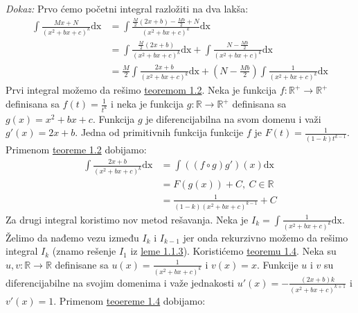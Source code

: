 \documentclass{article}
\begin{document}
\textit{Dokaz:} Prvo ćemo početni integral razložiti na dva lakša:
\begin{align*}
    \int \frac{Mx+N}{(x^2+bx+c)^k}\text{dx} & =\int \frac{\frac{M}{2}(2x+b)-\frac{Mb}{2}+N}{(x^2+bx+c)^k}\text{dx}                                    \\
                                            & =\int \frac{\frac{M}{2}(2x+b)}{(x^2+bx+c)^k}\text{dx}+\int\frac{N-\frac{Mb}{2}}{(x^2+bx+c)^k}\text{dx}  \\
                                            & =\frac{M}{2}\int \frac{2x+b}{(x^2+bx+c)^k}\text{dx}+(N-\frac{Mb}{2})\int\frac{1}{(x^2+bx+c)^k}\text{dx}
\end{align*}
Prvi integral možemo da rešimo \hyperref[teorema_1.2]{teoremom 1.2}. Neka je
funkcija $f: \mathbb{R}^{+}\longrightarrow\mathbb{R}^{+}$ definisana sa
$f(t)=\frac{1}{t^k}$ i neka je funkcija $g: \mathbb{R}\longrightarrow\mathbb{R}^{+}$
definisana sa $g(x)=x^2+bx+c$. Funkcija $g$ je diferencijabilna na svom domenu
i važi $g'(x)=2x+b$. Jedna od primitivnih funkcija funkcije $f$ je $F(t)=\frac{1}{(1-k)t^{k-1}}$.
Primenom \hyperref[teorema_1.2]{teoreme 1.2} dobijamo:
\begin{align*}
    \int \frac{2x+b}{(x^2+bx+c)^k}\text{dx} & =\int((f\circ g)g')(x)\text{dx}    \\
                                            & =F(g(x))+C,\ C\in\mathbb{R}        \\
                                            & =\frac{1}{(1-k)(x^2+bx+c)^{k-1}}+C
\end{align*}
Za drugi integral koristimo nov metod rešavanja.
Neka je $I_k=\int\frac{1}{(x^2+bx+c)^k}\text{dx}$. Želimo da nađemo vezu
između $I_k$ i $I_{k-1}$ jer onda rekurzivno možemo da
rešimo integral $I_k$ (znamo rešenje $I_1$ iz \hyperref[lema_1.1.3]{leme 1.1.3}). Koristićemo \hyperref[teorema_1.4]{teoremu 1.4}.
Neka su $u,v:\mathbb{R}\longrightarrow\mathbb{R}$ definisane sa $u(x)=\frac{1}{(x^2+bx+c)^k}$
i $v(x)=x$. Funkcije $u$ i $v$ su diferencijabilne na svojim domenima i
važe jednakosti $u'(x)=-\frac{(2x+b)k}{(x^2+bx+c)^{k+1}}$ i $v'(x)=1$.
Primenom \hyperref[teorema_1.4]{teoereme 1.4} dobijamo:
\end{document}
